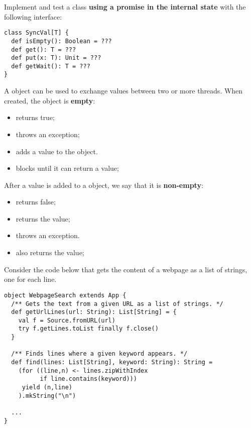 \documentclass[11pt]{article}
\begin{document}
\begin{myExercise}Implement and test a  class \textbf{using a promise in the internal state}  with the following interface:
\begin{lstlisting}
class SyncVal[T] {
  def isEmpty(): Boolean = ???
  def get(): T = ???
  def put(x: T): Unit = ???
  def getWait(): T = ???
}
\end{lstlisting}
A  object can be used to exchange values between two or more threads.
When created, the  object is \textbf{empty}:
\begin{itemize}
  \item {} returns true;
  \item {} throws an exception;
  \item {} adds a value to the  object.
  \item {} blocks until it can return a value;
\end{itemize}
After a value is added to a  object, we say that it is \textbf{non-empty}:
\begin{itemize}
  \item {} returns false;
  \item {} returns the value;
  \item {} throws an exception.
  \item {} also returns the value;
\end{itemize}
\end{myExercise}


\begin{myExercise}
  Consider the code below that gets the content of a webpage as a list of strings, one for each line.
\begin{lstlisting}
object WebpageSearch extends App {
  /** Gets the text from a given URL as a list of strings. */
  def getUrlLines(url: String): List[String] = {
    val f = Source.fromURL(url)
    try f.getLines.toList finally f.close()
  }

  /** Finds lines where a given keyword appears. */
  def find(lines: List[String], keyword: String): String =
    (for ((line,n) <- lines.zipWithIndex
          if line.contains(keyword)))
     yield (n,line)
    ).mkString("\n")

  ...
}
\end{lstlisting}
\end{myExercise}
\end{document}
